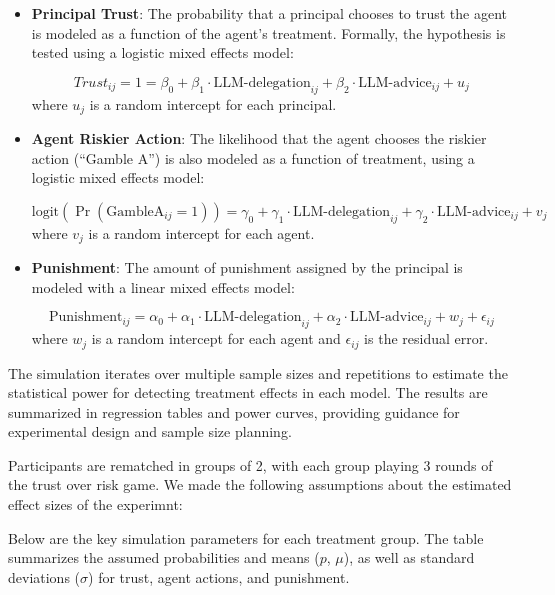 \documentclass[
]{article}
\begin{document}
\begin{itemize}
\item
  \textbf{Principal Trust}: The probability that a principal chooses to
  trust the agent is modeled as a function of the agent's treatment.
  Formally, the hypothesis is tested using a logistic mixed effects
  model:

  \[
  Trust_{ij} = 1 = \beta_0 + \beta_1 \cdot \text{LLM-delegation}_{ij} + \beta_2 \cdot \text{LLM-advice}_{ij} + u_j
  \] where \(u_j\) is a random intercept for each principal.
\item
  \textbf{Agent Riskier Action}: The likelihood that the agent chooses
  the riskier action (``Gamble A'') is also modeled as a function of
  treatment, using a logistic mixed effects model:

  \[
  \text{logit}(\Pr(\text{GambleA}_{ij} = 1)) = \gamma_0 + \gamma_1 \cdot \text{LLM-delegation}_{ij} + \gamma_2 \cdot \text{LLM-advice}_{ij} + v_j
  \] where \(v_j\) is a random intercept for each agent.
\item
  \textbf{Punishment}: The amount of punishment assigned by the
  principal is modeled with a linear mixed effects model:

  \[
  \text{Punishment}_{ij} = \alpha_0 + \alpha_1 \cdot \text{LLM-delegation}_{ij} + \alpha_2 \cdot \text{LLM-advice}_{ij} + w_j + \epsilon_{ij}
  \] where \(w_j\) is a random intercept for each agent and
  \(\epsilon_{ij}\) is the residual error.
\end{itemize}

The simulation iterates over multiple sample sizes and repetitions to
estimate the statistical power for detecting treatment effects in each
model. The results are summarized in regression tables and power curves,
providing guidance for experimental design and sample size planning.

Participants are rematched in groups of 2, with each group playing 3
rounds of the trust over risk game. We made the following assumptions
about the estimated effect sizes of the experimnt:

Below are the key simulation parameters for each treatment group. The
table summarizes the assumed probabilities and means (\(p\), \(\mu\)),
as well as standard deviations (\(\sigma\)) for trust, agent actions,
and punishment.
\end{document}
